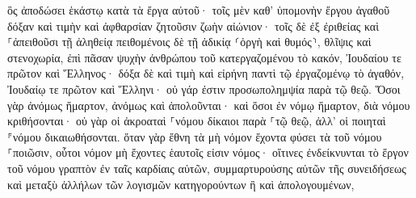 \documentclass{openreader}
\begin{document}
ὃς ἀποδώσει ἑκάστῳ κατὰ τὰ ἔργα αὐτοῦ· 
τοῖς μὲν καθ’ ὑπομονὴν ἔργου ἀγαθοῦ δόξαν καὶ τιμὴν καὶ ἀφθαρσίαν ζητοῦσιν ζωὴν αἰώνιον· 
τοῖς δὲ ἐξ ἐριθείας καὶ ⸀ἀπειθοῦσι τῇ ἀληθείᾳ πειθομένοις δὲ τῇ ἀδικίᾳ ⸂ὀργὴ καὶ θυμός⸃, 
θλῖψις καὶ στενοχωρία, ἐπὶ πᾶσαν ψυχὴν ἀνθρώπου τοῦ κατεργαζομένου τὸ κακόν, Ἰουδαίου τε πρῶτον καὶ Ἕλληνος· 
δόξα δὲ καὶ τιμὴ καὶ εἰρήνη παντὶ τῷ ἐργαζομένῳ τὸ ἀγαθόν, Ἰουδαίῳ τε πρῶτον καὶ Ἕλληνι· 
οὐ γάρ ἐστιν προσωπολημψία παρὰ τῷ θεῷ. 
Ὅσοι γὰρ ἀνόμως ἥμαρτον, ἀνόμως καὶ ἀπολοῦνται· καὶ ὅσοι ἐν νόμῳ ἥμαρτον, διὰ νόμου κριθήσονται· 
οὐ γὰρ οἱ ἀκροαταὶ ⸀νόμου δίκαιοι παρὰ ⸀τῷ θεῷ, ἀλλ’ οἱ ποιηταὶ ⸁νόμου δικαιωθήσονται. 
ὅταν γὰρ ἔθνη τὰ μὴ νόμον ἔχοντα φύσει τὰ τοῦ νόμου ⸀ποιῶσιν, οὗτοι νόμον μὴ ἔχοντες ἑαυτοῖς εἰσιν νόμος· 
οἵτινες ἐνδείκνυνται τὸ ἔργον τοῦ νόμου γραπτὸν ἐν ταῖς καρδίαις αὐτῶν, συμμαρτυρούσης αὐτῶν τῆς συνειδήσεως καὶ μεταξὺ ἀλλήλων τῶν λογισμῶν κατηγορούντων ἢ καὶ ἀπολογουμένων, 
\end{document}
